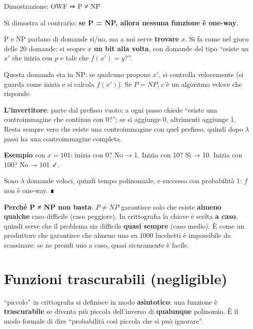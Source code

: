 \begin{approfondimento}{Dimostrazione: OWF ⇒ P ≠ NP}

Si dimostra al contrario: \textbf{se P = NP, allora nessuna funzione è one-way}.

P e NP parlano di domande sì/no, ma a noi serve \textbf{trovare} \(x\). Si fa come nel gioco delle 20 domande: si scopre \(x\) \textbf{un bit alla volta}, con domande del tipo ``esiste un \(x'\) che inizia con \(p\) e tale che \(f(x') = y\)?''.

Questa domanda sta in NP: se qualcuno propone \(x'\), si controlla velocemente (si guarda come inizia e si calcola \(f(x')\)). Se \(P = NP\), c'è un algoritmo veloce che risponde.

\textbf{L'invertitore}: parte dal prefisso vuoto; a ogni passo chiede ``esiste una controimmagine che continua con 0?''; se sì aggiunge 0, altrimenti aggiunge 1. Resta sempre vero che esiste una controimmagine con quel prefisso, quindi dopo \(\lambda\) passi ha una controimmagine completa.

\textbf{Esempio} con \(x = 101\): inizia con 0? No → 1. Inizia con 10? Sì → 10. Inizia con 100? No → 101 ✓.

Sono \(\lambda\) domande veloci, quindi tempo polinomiale, e successo con probabilità 1: \(f\) non è one-way. ∎

\end{approfondimento}

\textbf{Perché P ≠ NP non basta}: \(P \neq NP\) garantisce solo che esiste \textbf{almeno qualche} caso difficile (caso peggiore). In crittografia la chiave è scelta \textbf{a caso}, quindi serve che il problema sia difficile \textbf{quasi sempre} (caso medio). È come un produttore che garantisce che almeno uno su 1000 lucchetti è impossibile da scassinare: se ne prendi uno a caso, quasi sicuramente è facile.

\section{Funzioni trascurabili (negligible)}

\begin{inbreve}

``piccolo'' in crittografia si definisce in modo \textbf{asintotico}: una funzione è \textbf{trascurabile} se diventa più piccola dell'inverso di \textbf{qualunque} polinomio. È il modo formale di dire ``probabilità così piccola che si può ignorare''.

\end{inbreve}

